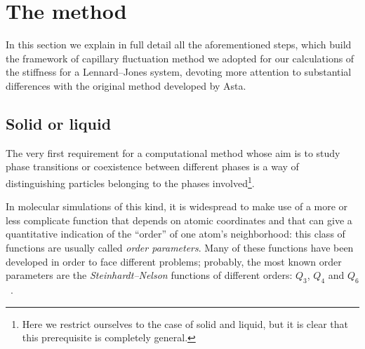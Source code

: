 \section{The method\label{sec:method}}
In this section we explain in full detail all the aforementioned steps, which build the framework of capillary fluctuation method we adopted for our calculations of the stiffness for a Lennard--Jones system,  devoting more attention to substantial differences with the original method developed by Asta.

\subsection{Solid or liquid}
The very first requirement for a computational method whose aim is to study phase transitions or coexistence between different phases is a way of distinguishing particles belonging to the phases involved\footnote{Here we restrict ourselves to the case of solid and liquid, but it is clear that this prerequisite is completely general.}.

In molecular simulations of this kind, it is widespread to make use of a more or less complicate function that depends on atomic coordinates and that can give a quantitative indication of the ``order'' of one atom's neighborhood: this class of functions are usually called \emph{order parameters}. Many of these functions have been developed in order to face different problems; probably, the most known order parameters are the \textit{Steinhardt--Nelson} functions of different orders: $Q_3$, $Q_4$ and $Q_6$~\cite{Steinhardt1983}.

